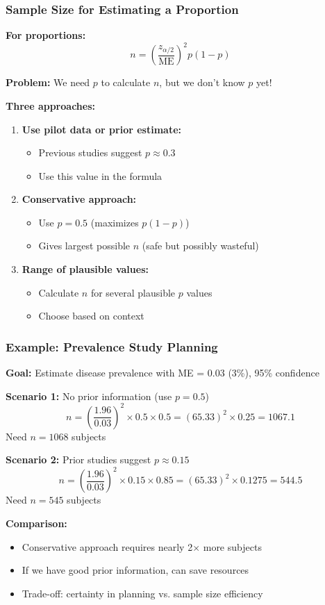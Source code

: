 \documentclass{beamer}
\begin{document}
\begin{frame}
\frametitle{Sample Size for Estimating a Proportion}
\textbf{For proportions:}
$$n = \left(\frac{z_{\alpha/2}}{\text{ME}}\right)^2 p(1-p)$$

\vspace{0.3cm}
\textbf{Problem:} We need $p$ to calculate $n$, but we don't know $p$ yet!

\vspace{0.5cm}
\textbf{Three approaches:}

\begin{enumerate}
\item \textbf{Use pilot data or prior estimate:}
  \begin{itemize}
  \item Previous studies suggest $p \approx 0.3$
  \item Use this value in the formula
  \end{itemize}

\item \textbf{Conservative approach:}
  \begin{itemize}
  \item Use $p = 0.5$ (maximizes $p(1-p)$)
  \item Gives largest possible $n$ (safe but possibly wasteful)
  \end{itemize}

\item \textbf{Range of plausible values:}
  \begin{itemize}
  \item Calculate $n$ for several plausible $p$ values
  \item Choose based on context
  \end{itemize}
\end{enumerate}
\end{frame}

\begin{frame}
\frametitle{Example: Prevalence Study Planning}
\textbf{Goal:} Estimate disease prevalence with ME = 0.03 (3\%), 95\% confidence

\vspace{0.3cm}
\textbf{Scenario 1:} No prior information (use $p = 0.5$)
$$n = \left(\frac{1.96}{0.03}\right)^2 \times 0.5 \times 0.5 = (65.33)^2 \times 0.25 = 1067.1$$
Need $n = 1068$ subjects

\vspace{0.3cm}
\textbf{Scenario 2:} Prior studies suggest $p \approx 0.15$
$$n = \left(\frac{1.96}{0.03}\right)^2 \times 0.15 \times 0.85 = (65.33)^2 \times 0.1275 = 544.5$$
Need $n = 545$ subjects

\vspace{0.5cm}
\textbf{Comparison:}
\begin{itemize}
\item Conservative approach requires nearly 2$\times$ more subjects
\item If we have good prior information, can save resources
\item Trade-off: certainty in planning vs. sample size efficiency
\end{itemize}
\end{frame}
\end{document}
